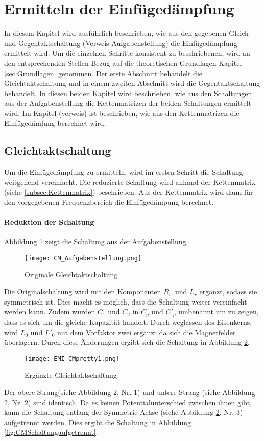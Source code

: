 \section{Ermitteln der Einfügedämpfung} \label{sec:umsetzung}
In diesem Kapitel wird ausführlich beschrieben, wie aus den gegebenen Gleich- und Gegentaktschaltung (Verweis Aufgabenstellung) die Einfügedämpfung ermittelt wird. Um die einzelnen Schritte konsistent zu beschriebenen, wird an den entsprechenden Stellen Bezug auf die theoretischen Grundlagen Kapitel \ref{sec:Grundlagen} genommen. Der erste Abschnitt behandelt die Gleichtaktschaltung und in einem zweiten Abschnitt wird die Gegentaktschaltung behandelt. In diesen beiden Kapitel wird beschrieben, wie aus den Schaltungen aus der Aufgabenstellung die Kettenmatrizen der beiden Schaltungen ermittelt wird. Im Kapitel (verweis) ist beschrieben, wie aus den Kettenmatrizen die Einfügedämfung berechnet wird.


\subsection{Gleichtaktschaltung}\label{subsec:zusammenfassungGleichtakt}
Um die Einfügedämpfung zu ermitteln, wird im ersten Schritt die Schaltung weitgehend vereinfacht. Die reduzierte Schaltung wird anhand der Kettenmatrix (siehe \ref{subsec:Kettenmatrix}) beschrieben. Aus der Kettenmatrix wird dann für den vorgegebenen Frequenzbereich die Einfügedämpung berechnet.

\paragraph{Reduktion der Schaltung}\label{para:redukGleichtakt}
Abbildung \ref{fig:CMSchaltungOriginal} zeigt die Schaltung aus der Aufgabenstellung. 
\begin{figure}[H]
	\centering
	\texttt{[image: CM\_Aufgabenstellung.png]}
	\caption{Originale Gleichtaktschaltung\cite{aufgabenstellung}}
	\label{fig:CMSchaltungOriginal}
\end{figure}
Die Originalschaltung wird mit den Komponenten $R_w$ und $L_r$ ergänzt, sodass sie symmetrisch ist. Dies macht es möglich, dass die Schaltung weiter vereinfacht werden kann. Zudem wurden $C_1$ und $C_2$ in $C_p$ und $C'_p$ umbenannt um zu zeigen, dass es sich um die gleiche Kapazität handelt. Durch weglassen des Eisenkerns, wird $L_0$ und $L'_0$ mit dem Vorfaktor zwei ergänzt da sich die Magnetfelder überlagern. %
Durch diese Änderungen ergibt sich die Schaltung in Abbildung \ref{fig:CMSchaltungErgänzt}.
\begin{figure}[H]
	\centering
	\texttt{[image: EMI\_CMpretty1.png]}
	\caption{Ergänzte Gleichtaktschaltung}
	\label{fig:CMSchaltungErgänzt}
\end{figure}
 Der obere Strang(siehe Abbildung \ref{fig:CMSchaltungErgänzt}, Nr. 1) und untere Strang (siehe Abbildung \ref{fig:CMSchaltungErgänzt}, Nr. 2) sind identisch. Da es keinen Potentialunterschied zwischen ihnen gibt, kann die Schaltung entlang der Symmetrie-Achse (siehe Abbildung \ref{fig:CMSchaltungErgänzt}, Nr. 3) aufgetrennt werden. Dies ergibt die Schaltung in Abbildung \ref{fig:CMSchaltungaufgetrennt}.


